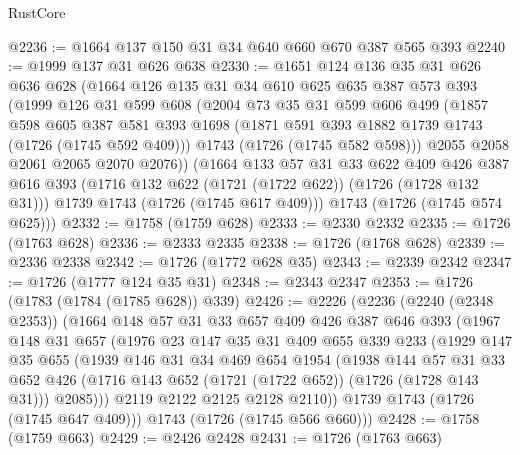 \begin{lexlean}{RustCore}
\begin{coremodule}
@2236 := @1664 @137 @150 @31 @34 @640 @660 @670 @387 @565 @393
@2240 := @1999 @137 @31 @626 @638
@2330 := @1651
    @124
    @136
    @35
    @31
    @626
    @636
    @628
    (@1664
      @126
      @135
      @31
      @34
      @610
      @625
      @635
      @387
      @573
      @393
      (@1999
        @126
        @31
        @599
        @608
        (@2004
          @73
          @35
          @31
          @599
          @606
          @499
          (@1857
            @598
            @605
            @387
            @581
            @393
            @1698
            (@1871 @591 @393 @1882 @1739 @1743 (@1726 (@1745 @592 @409)))
            @1743
            (@1726 (@1745 @582 @598)))
          @2055
          @2058
          @2061
          @2065
          @2070
          @2076))
      (@1664
        @133
        @57
        @31
        @33
        @622
        @409
        @426
        @387
        @616
        @393
        (@1716 @132 @622 (@1721 (@1722 @622)) (@1726 (@1728 @132 @31)))
        @1739
        @1743
        (@1726 (@1745 @617 @409)))
      @1743
      (@1726 (@1745 @574 @625)))
@2332 := @1758 (@1759 @628)
@2333 := @2330 @2332
@2335 := @1726 (@1763 @628)
@2336 := @2333 @2335
@2338 := @1726 (@1768 @628)
@2339 := @2336 @2338
@2342 := @1726 (@1772 @628 @35)
@2343 := @2339 @2342
@2347 := @1726 (@1777 @124 @35 @31)
@2348 := @2343 @2347
@2353 := @1726 (@1783 (@1784 (@1785 @628)) @339)
@2426 := @2226
    (@2236
      (@2240 (@2348 @2353))
      (@1664
        @148
        @57
        @31
        @33
        @657
        @409
        @426
        @387
        @646
        @393
        (@1967
          @148
          @31
          @657
          (@1976
            @23
            @147
            @35
            @31
            @409
            @655
            @339
            @233
            (@1929
              @147
              @35
              @655
              (@1939
                @146
                @31
                @34
                @469
                @654
                @1954
                (@1938
                  @144
                  @57
                  @31
                  @33
                  @652
                  @426
                  (@1716 @143 @652 (@1721 (@1722 @652)) (@1726 (@1728 @143 @31)))
                  @2085)))
            @2119
            @2122
            @2125
            @2128
            @2110))
        @1739
        @1743
        (@1726 (@1745 @647 @409)))
      @1743
      (@1726 (@1745 @566 @660)))
@2428 := @1758 (@1759 @663)
@2429 := @2426 @2428
@2431 := @1726 (@1763 @663)

\end{coremodule}
\end{lexlean}
